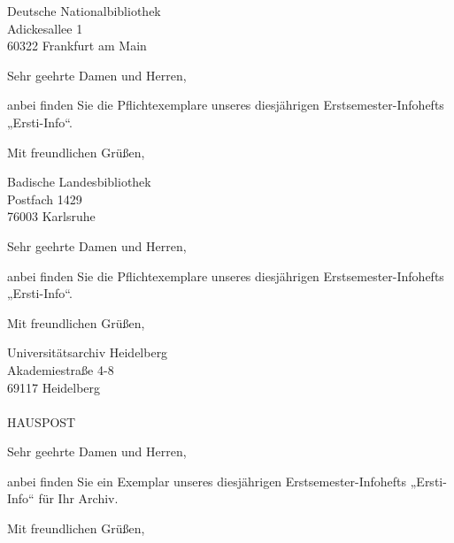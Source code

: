 \documentclass{mathphys-letter}
\begin{document}
	\begin{letter}{Deutsche Nationalbibliothek\\Adickesallee 1\\60322 Frankfurt am Main}
		\opening{Sehr geehrte Damen und Herren,}
		anbei finden Sie die Pflichtexemplare unseres diesjährigen Erstsemester-Infohefts „Ersti-Info“.
		\closing{Mit freundlichen Grüßen,}
	\end{letter}
	\begin{letter}{Badische Landesbibliothek\\Postfach 1429\\76003 Karlsruhe}
		\opening{Sehr geehrte Damen und Herren,}
		anbei finden Sie die Pflichtexemplare unseres diesjährigen Erstsemester-Infohefts „Ersti-Info“.
		\closing{Mit freundlichen Grüßen,}
	\end{letter}
	\begin{letter}{Universitätsarchiv Heidelberg\\Akademiestraße 4-8\\69117 Heidelberg\\\quad\\HAUSPOST}
		\opening{Sehr geehrte Damen und Herren,}
		anbei finden Sie ein Exemplar unseres diesjährigen Erstsemester-Infohefts „Ersti-Info“ für Ihr Archiv.
		\closing{Mit freundlichen Grüßen,}
	\end{letter}
\end{document}
